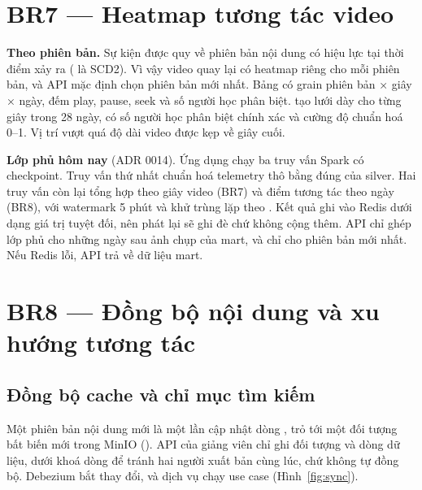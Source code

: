 \section{BR7 --- Heatmap tương tác video}

\textbf{Theo phiên bản.} Sự kiện được quy về phiên bản nội dung có hiệu lực tại thời điểm xảy ra ( là SCD2). Vì vậy video quay lại có heatmap riêng cho mỗi phiên bản, và API mặc định chọn phiên bản mới nhất. Bảng  có grain phiên bản × giây × ngày, đếm play, pause, seek và số người học phân biệt.  tạo lưới dày cho từng giây trong 28 ngày, có số người học phân biệt chính xác và cường độ chuẩn hoá 0--1. Vị trí vượt quá độ dài video được kẹp về giây cuối.

\textbf{Lớp phủ hôm nay} (ADR 0014). Ứng dụng  chạy ba truy vấn Spark có checkpoint. Truy vấn thứ nhất chuẩn hoá telemetry thô bằng đúng  của silver. Hai truy vấn còn lại tổng hợp theo giây video (BR7) và điểm tương tác theo ngày (BR8), với watermark 5 phút và khử trùng lặp theo . Kết quả ghi vào Redis dưới dạng giá trị tuyệt đối, nên phát lại sẽ ghi đè chứ không cộng thêm. API chỉ ghép lớp phủ cho những ngày sau ảnh chụp của mart, và chỉ cho phiên bản mới nhất. Nếu Redis lỗi, API trả về dữ liệu mart.

\section{BR8 --- Đồng bộ nội dung và xu hướng tương tác}

\subsection{Đồng bộ cache và chỉ mục tìm kiếm}
\label{sec:br8-sync}

Một phiên bản nội dung mới là một lần cập nhật dòng , trỏ tới một đối tượng bất biến mới trong MinIO (). API của giảng viên chỉ ghi đối tượng và dòng dữ liệu, dưới khoá dòng để tránh hai người xuất bản cùng lúc, chứ không tự đồng bộ. Debezium bắt thay đổi, và dịch vụ  chạy use case  (Hình~\ref{fig:sync}).

